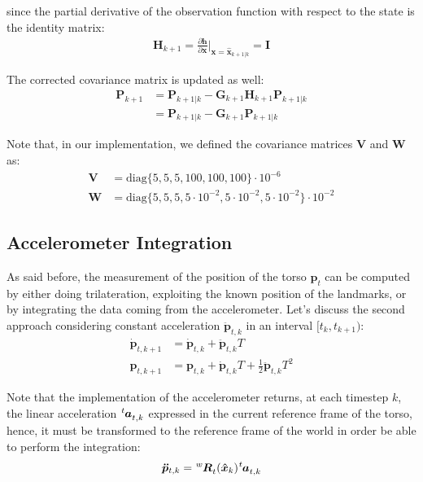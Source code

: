 \documentclass[a4paper]{article}
\newcommand{\at}[2][]{#1|_{#2}}
\begin{document}
\noindent since the partial derivative of the observation
function with respect to the state is the identity matrix:
\begin{align}
    \bm{H}_{k+1} = \frac{\partial \bm{h}}{\partial \bm{x}} \at[\bigg]{\bm{x}=\bm{\hat{x}}_{k+1|k}}
        = \bm{I}
\end{align}

The corrected covariance matrix is updated as well:
\begin{align}
    \bm{P}_{k+1} &= \bm{P}_{k+1|k} - \bm{G}_{k+1} \bm{H}_{k+1} \bm{P}_{k+1|k} \\
        &= \bm{P}_{k+1|k} - \bm{G}_{k+1} \bm{P}_{k+1|k}
\end{align}

Note that, in our implementation, we defined the covariance
matrices $\bm{V}$ and $\bm{W}$ as:
\begin{align}
    \bm{V} &= \text{diag}\{5, 5, 5, 100, 100, 100 \} \cdot 10^{-6} \\
    \bm{W} &= \text{diag}\{5, 5, 5, 5 \cdot 10^{-2}, 5 \cdot 10^{-2}, 5 \cdot 10^{-2} \}  \cdot 10^{-2}
\end{align}

\subsection{Accelerometer Integration}
\label{subsec:accelerometer-integration}

As said before, the measurement of the position of the torso $\bm{p}_t$ can be computed
by either doing trilateration, exploiting the known position of the landmarks, or
by integrating the data coming from the accelerometer. Let's discuss the second
approach considering constant acceleration $\bm{\ddot{p}}_{t, k}$ in an interval $[t_k, t_{k+1})$:
\begin{align}
    \label{eq:velocity-accelerometer-integration}
    \bm{\dot{p}}_{t, k+1} &= \bm{\dot{p}}_{t, k} + \bm{\ddot{p}}_{t, k} T \\
    \label{eq:position-accelerometer-integration}
    \bm{p}_{t, k+1} &= \bm{p}_{t, k} + \bm{\dot{p}}_{t, k} T + \frac{1}{2} \bm{\ddot{p}}_{t, k} T^2
\end{align}

Note that the implementation of the accelerometer returns, at each timestep $k$,
the linear acceleration $\tensor[^t]{\bm{a}}{_{t,k}}$ expressed in the
current reference frame of the torso, hence, it must be transformed to the
reference frame of the world in order be able to perform the integration:
\begin{equation}
    \bm{\ddot{p}}_{t,k} = \tensor[^w]{\bm{R}}{_t}(\bm{\hat{x}}_{k}) \tensor[^t]{\bm{a}}{_{t,k}}
\end{equation}
\end{document}
